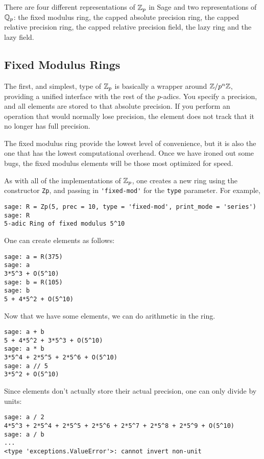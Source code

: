 \documentclass[12pt]{article}
\begin{document}
There are four different representations of $\mathbb{Z}_p$ in Sage and two representations of $\mathbb{Q}_p$:
the fixed modulus ring, the capped absolute precision ring, the capped relative precision
ring, the capped relative precision field, the lazy ring and the lazy field.

\subsection{Fixed Modulus Rings}
The first, and simplest, type of $\mathbb{Z}_p$ is basically a wrapper around $\mathbb{Z} / p^n\mathbb{Z}$, providing a
unified interface with the rest of the $p$-adics.  You specify a precision, and all elements
are stored to that absolute precision.  If you perform an operation that would normally lose
precision, the element does not track that it no longer has full precision.

The fixed modulus ring provide the lowest level of convenience, but it is also the one that
has the lowest computational overhead.  Once we have ironed out some bugs, the fixed modulus
elements will be those most optimized for speed.

As with all of the implementations of $\mathbb{Z}_p$, one creates a new ring using the constructor
\verb/Zp/, and passing in \verb/'fixed-mod'/ for the \verb/type/ parameter.  For example,
\begin{verbatim}
sage: R = Zp(5, prec = 10, type = 'fixed-mod', print_mode = 'series')
sage: R
5-adic Ring of fixed modulus 5^10
\end{verbatim}

One can create elements as follows:
\begin{verbatim}
sage: a = R(375)
sage: a
3*5^3 + O(5^10)
sage: b = R(105)
sage: b
5 + 4*5^2 + O(5^10)
\end{verbatim}

Now that we have some elements, we can do arithmetic in the ring.
\begin{verbatim}
sage: a + b
5 + 4*5^2 + 3*5^3 + O(5^10)
sage: a * b
3*5^4 + 2*5^5 + 2*5^6 + O(5^10)
sage: a // 5
3*5^2 + O(5^10)
\end{verbatim}

Since elements don't actually store their actual precision, one can only divide by units:
\begin{verbatim}
sage: a / 2
4*5^3 + 2*5^4 + 2*5^5 + 2*5^6 + 2*5^7 + 2*5^8 + 2*5^9 + O(5^10)
sage: a / b
...
<type 'exceptions.ValueError'>: cannot invert non-unit
\end{verbatim}
\end{document}
